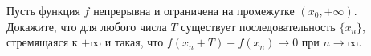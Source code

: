 \documentclass{article}
\begin{document}
Пусть функция $f$ непрерывна и ограничена на промежутке $(x_0, +\infty)$. Докажите, что для любого числа $T$ 
существует последовательность $\{x_n\}$, стремящаяся к $+\infty$ и такая, что $f(x_n+T) - f(x_n) \to 0$ при $n \to \infty$.
\end{document}
